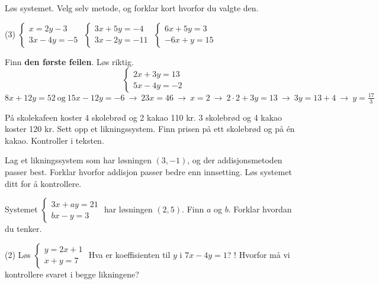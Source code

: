 Løs systemet. Velg selv metode, og forklar kort hvorfor du valgte den.
\begin{tasks}(3)
  \task $\begin{cases} x = 2y - 3\\ 3x - 4y = -5 \end{cases}$
  \task $\begin{cases} 3x + 5y = -4\\ 3x - 2y = -11 \end{cases}$
  \task $\begin{cases} 6x + 5y = 3\\ -6x + y = 15 \end{cases}$
\end{tasks}

Finn \textbf{den første feilen}. Løs riktig.
\[ \begin{cases} 2x + 3y = 13\\ 5x - 4y = -2 \end{cases} \]
\[ 8x + 12y = 52 \ \text{og} \ 15x - 12y = -6 \ \to\ 23x = 46 \ \to\ x = 2 \ \to\ 2 \cdot 2 + 3y = 13 \ \to\ 3y = 13 + 4 \ \to\ y = \tfrac{17}{3} \]

På skolekafeen koster 4 skolebrød og 2 kakao 110 kr. 3 skolebrød og 4 kakao koster 120 kr.
Sett opp et likningssystem. Finn prisen på ett skolebrød og på én kakao. Kontroller i teksten.


Lag et likningssystem som har løsningen $(3, -1)$, og der addisjonsmetoden passer best.
Forklar hvorfor addisjon passer bedre enn innsetting. Løs systemet ditt for å kontrollere.

Systemet $\begin{cases} 3x + ay = 21\\ bx - y = 3 \end{cases}$ har løsningen $(2, 5)$. Finn $a$ og $b$. Forklar hvordan du tenker.

\begin{sjekk}
\begin{tasks}(2)
  \task Løs $\begin{cases} y = 2x + 1\\ x + y = 7 \end{cases}$
  \task Hva er koeffisienten til $y$ i $7x - 4y = 1$?
  \task! Hvorfor må vi kontrollere svaret i begge likningene?
\end{tasks}
\end{sjekk}

